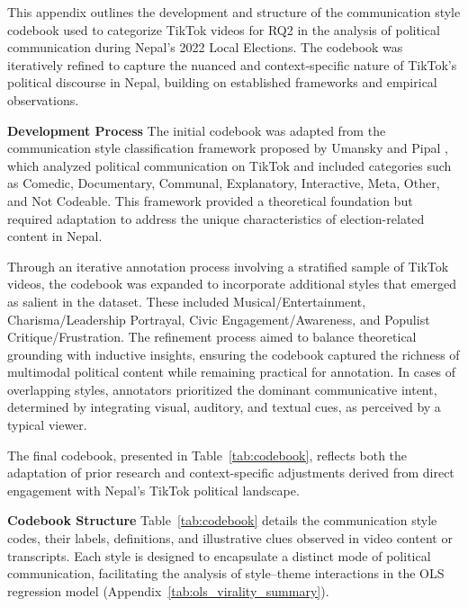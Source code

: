 \documentclass[12pt,a4paper]{report}
\begin{document}
This appendix outlines the development and structure of the communication style codebook used to categorize TikTok videos for RQ2 in the analysis of political communication during Nepal’s 2022 Local Elections. The codebook was iteratively refined to capture the nuanced and context-specific nature of TikTok’s political discourse in Nepal, building on established frameworks and empirical observations.

\textbf{Development Process}
The initial codebook was adapted from the communication style classification framework proposed by Umansky and Pipal \parencite{umansky2023dances}, which analyzed political communication on TikTok and included categories such as Comedic, Documentary, Communal, Explanatory, Interactive, Meta, Other, and Not Codeable. This framework provided a theoretical foundation but required adaptation to address the unique characteristics of election-related content in Nepal.

Through an iterative annotation process involving a stratified sample of TikTok videos, the codebook was expanded to incorporate additional styles that emerged as salient in the dataset. These included Musical/Entertainment, Charisma/Leadership Portrayal, Civic Engagement/Awareness, and Populist Critique/Frustration. The refinement process aimed to balance theoretical grounding with inductive insights, ensuring the codebook captured the richness of multimodal political content while remaining practical for annotation. In cases of overlapping styles, annotators prioritized the dominant communicative intent, determined by integrating visual, auditory, and textual cues, as perceived by a typical viewer.

The final codebook, presented in Table~\ref{tab:codebook}, reflects both the adaptation of prior research and context-specific adjustments derived from direct engagement with Nepal’s TikTok political landscape.

\textbf{Codebook Structure}
Table~\ref{tab:codebook} details the communication style codes, their labels, definitions, and illustrative clues observed in video content or transcripts. Each style is designed to encapsulate a distinct mode of political communication, facilitating the analysis of style--theme interactions in the OLS regression model (Appendix~\ref{tab:ols_virality_summary}).
\end{document}
